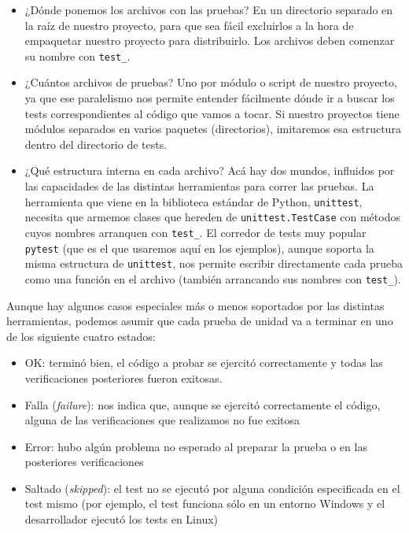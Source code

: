 \begin{itemize}
\item ¿Dónde ponemos los archivos con las pruebas? En un directorio separado en la raíz de nuestro proyecto, para que sea fácil excluirlos a la hora de empaquetar nuestro proyecto para distribuirlo. Los archivos deben comenzar su nombre con \texttt{test\_}.

\item ¿Cuántos archivos de pruebas? Uno por módulo o script de nuestro proyecto, ya que ese paralelismo nos permite entender fácilmente dónde ir a buscar los tests correspondientes al código que vamos a tocar. Si nuestro proyectos tiene módulos separados en varios paquetes (directorios), imitaremos esa estructura dentro del directorio de tests.

\item ¿Qué estructura interna en cada archivo? Acá hay dos mundos, influidos por las capacidades de las distintas herramientas para correr las pruebas. La herramienta que viene en la biblioteca estándar de Python, \texttt{unittest}, necesita que armemos clases que hereden de \texttt{unittest.TestCase} con métodos cuyos nombres arranquen con \texttt{test\_}. El corredor de tests muy popular \texttt{pytest} (que es el que usaremos aquí en los ejemplos), aunque soporta la misma estructura de \texttt{unittest}, nos permite escribir directamente cada prueba como una función en el archivo (también arrancando sus nombres con \texttt{test\_}).
\end{itemize}

Aunque hay algunos casos especiales más o menos soportados por las distintas herramientas, podemos asumir que cada prueba de unidad va a terminar en uno de los siguiente cuatro estados:

\begin{itemize}
\item OK: terminó bien, el código a probar se ejercitó correctamente y todas las verificaciones posteriores fueron exitosas.

\item Falla (\textit{failure}): nos indica que, aunque se ejercitó correctamente el código, alguna de las verificaciones que realizamos no fue exitosa

\item Error: hubo algún problema no esperado al preparar la prueba o en las posteriores verificaciones

\item Saltado (\textit{skipped}): el test no se ejecutó por alguna condición especificada en el test mismo (por ejemplo, el test funciona sólo en un entorno Windows y el desarrollador ejecutó los tests en Linux)
\end{itemize}

